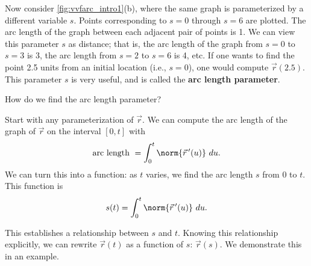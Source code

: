 Now consider \autoref{fig:vvfarc_intro1}(b), where the same graph is parameterized by a different variable $s$.  Points corresponding to $s=0$ through $s=6$ are plotted. The arc length of the graph between each adjacent pair of points is 1. We can view this parameter $s$ as distance; that is, the arc length of the graph from $s=0$ to $s=3$ is 3, the arc length from $s=2$ to $s=6$ is 4, etc. If one wants to find the point 2.5 units from an initial location (i.e., $s=0$), one would compute $\vec r(2.5)$. This parameter $s$ is very useful, and is called the \textbf{arc length parameter}.

How do we find the arc length parameter? 

Start with any parameterization of $\vec r$. We can compute the arc length of the graph of $\vec r$ on the interval $[0,t]$ with
\[\text{arc length } = \int_0^t\norm{\vec r\,'(u)}\ du.\]
We can turn this into a function: as $t$ varies, we find the arc length $s$ from $0$ to $t$. This function is
\begin{equation}
s(t) = \int_0^t \norm{\vec r\,'(u)}\ du.\label{eq:vvfarc}
\end{equation}

This establishes a relationship between $s$ and $t$. Knowing this relationship explicitly, we can rewrite $\vec r(t)$ as a function of $s$: $\vec r(s)$. We demonstrate this in an example.


